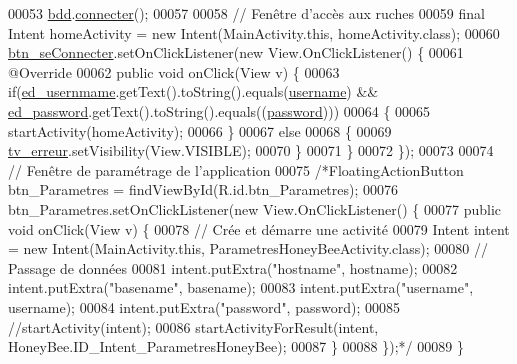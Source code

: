 \begin{DoxyCode}
00053         \hyperlink{classfr_1_1campus_1_1laurainc_1_1honeybee_1_1_main_activity_ae01aec19dc79f2c48d1807ccb2d3fa4a}{bdd}.\hyperlink{classfr_1_1campus_1_1laurainc_1_1honeybee_1_1_base_de_donnees_a08564ea7dccde161d6eac4b8879401bb}{connecter}();
00057 
00058         \textcolor{comment}{// Fenêtre d'accès aux ruches}
00059         \textcolor{keyword}{final} Intent homeActivity = \textcolor{keyword}{new} Intent(MainActivity.this, homeActivity.class);
00060        \hyperlink{classfr_1_1campus_1_1laurainc_1_1honeybee_1_1_main_activity_a137abde1340a5e7a9b46decff93ad628}{btn\_seConnecter}.setOnClickListener(\textcolor{keyword}{new} View.OnClickListener() \{
00061            @Override
00062            \textcolor{keyword}{public} \textcolor{keywordtype}{void} onClick(View v) \{
00063                \textcolor{keywordflow}{if}(\hyperlink{classfr_1_1campus_1_1laurainc_1_1honeybee_1_1_main_activity_a6735d2eaf34b76f04b3adbb81d0c9718}{ed\_usernmame}.getText().toString().equals(\hyperlink{classfr_1_1campus_1_1laurainc_1_1honeybee_1_1_main_activity_a1acb2db3f66e167ea225e281d900f842}{username}) && 
      \hyperlink{classfr_1_1campus_1_1laurainc_1_1honeybee_1_1_main_activity_aba0af7add7bf1a55d54043f88deac4ee}{ed\_password}.getText().toString().equals((\hyperlink{classfr_1_1campus_1_1laurainc_1_1honeybee_1_1_main_activity_a3cc5f979af0f495f346052f51bd8cd66}{password})))
00064                \{
00065                    startActivity(homeActivity);
00066                \}
00067                \textcolor{keywordflow}{else}
00068                \{
00069                     \hyperlink{classfr_1_1campus_1_1laurainc_1_1honeybee_1_1_main_activity_ad36da534773710973fd7696ecc23c117}{tv\_erreur}.setVisibility(View.VISIBLE);
00070                \}
00071            \}
00072        \});
00073 
00074         \textcolor{comment}{// Fenêtre de paramétrage de l'application}
00075         \textcolor{comment}{/*FloatingActionButton btn\_Parametres = findViewById(R.id.btn\_Parametres);
}
00076 \textcolor{comment}{        btn\_Parametres.setOnClickListener(new View.OnClickListener() \{
}
00077 \textcolor{comment}{            public void onClick(View v) \{
}
00078 \textcolor{comment}{                // Crée et démarre une activité
}
00079 \textcolor{comment}{                Intent intent = new Intent(MainActivity.this, ParametresHoneyBeeActivity.class);
}
00080 \textcolor{comment}{                // Passage de données
}
00081 \textcolor{comment}{                intent.putExtra("hostname", hostname);
}
00082 \textcolor{comment}{                intent.putExtra("basename", basename);
}
00083 \textcolor{comment}{                intent.putExtra("username", username);
}
00084 \textcolor{comment}{                intent.putExtra("password", password);
}
00085 \textcolor{comment}{                //startActivity(intent);
}
00086 \textcolor{comment}{                startActivityForResult(intent, HoneyBee.ID\_Intent\_ParametresHoneyBee);
}
00087 \textcolor{comment}{            \}
}
00088 \textcolor{comment}{        \});*/}
00089     \}
\end{DoxyCode}


